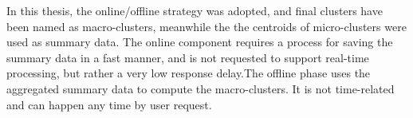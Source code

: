 In this thesis, the online/offline strategy was adopted, and final clusters have been named as macro-clusters, meanwhile the the centroids of micro-clusters were used as summary data. The online component requires a process for saving the summary data in a fast manner, and is not requested to support real-time processing, but rather a very low response delay.The offline phase uses the aggregated summary data to compute the macro-clusters. It is not time-related and can happen any time by user request.




    









